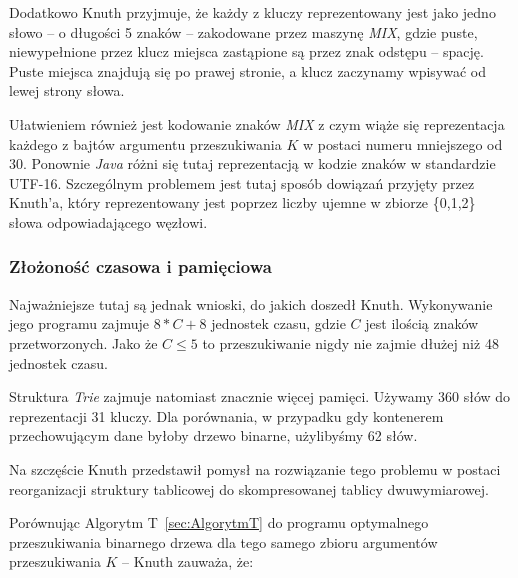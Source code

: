     Dodatkowo Knuth przyjmuje, że każdy z kluczy reprezentowany jest jako jedno słowo -- o długości 5 znaków -- zakodowane przez maszynę \emph{MIX}, gdzie puste, niewypełnione przez klucz miejsca zastąpione są przez znak odstępu -- spację. Puste miejsca znajdują się po prawej stronie, a klucz zaczynamy wpisywać od lewej strony słowa.
	
    Ułatwieniem również jest kodowanie znaków \emph{MIX} z czym wiąże się reprezentacja każdego z bajtów argumentu przeszukiwania $K$ w postaci numeru mniejszego od 30. Ponownie \emph{Java} różni się tutaj reprezentacją w kodzie znaków w standardzie UTF-16. Szczególnym problemem jest tutaj sposób dowiązań przyjęty przez Knuth'a, który reprezentowany jest poprzez liczby ujemne w zbiorze \{0,1,2\} słowa odpowiadającego węzłowi.
	
	\subsubsection{Złożoność czasowa i pamięciowa}\label{sec:AlgorytmTZlozonoscCzasowaIPamieciowa}
	
    Najważniejsze tutaj są jednak wnioski, do jakich doszedł Knuth. Wykonywanie jego programu zajmuje $8*C+8$ jednostek czasu, gdzie $C$ jest ilością znaków przetworzonych. Jako że $C\leq5$ to przeszukiwanie nigdy nie zajmie dłużej niż 48 jednostek czasu.
    
	Struktura \emph{Trie} zajmuje natomiast znacznie więcej pamięci. Używamy 360 słów do reprezentacji 31 kluczy. Dla porównania, w przypadku gdy kontenerem przechowującym dane byłoby drzewo binarne, użylibyśmy 62 słów.
	
	Na szczęście Knuth przedstawił pomysł na rozwiązanie tego problemu w postaci reorganizacji struktury tablicowej do skompresowanej tablicy dwuwymiarowej.
	
	Porównując Algorytm T~\ref{sec:AlgorytmT} do programu optymalnego przeszukiwania binarnego drzewa dla tego samego zbioru argumentów przeszukiwania $K$ -- Knuth zauważa, że:
	
